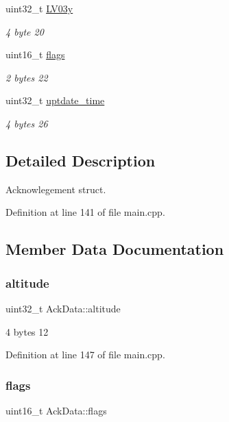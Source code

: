 \begin{DoxyCompactItemize}
uint32\+\_\+t \mbox{\hyperlink{structAckData_a1111544b84d5ecfa27f168d988e28b8f}{L\+V03y}}
\begin{DoxyCompactList}\small\item\em 4 byte 20 \end{DoxyCompactList}\item 
uint16\+\_\+t \mbox{\hyperlink{structAckData_a423568032481378a35f473683a81f949}{flags}}
\begin{DoxyCompactList}\small\item\em 2 bytes 22 \end{DoxyCompactList}\item 
uint32\+\_\+t \mbox{\hyperlink{structAckData_a577cc4e03ced6b2702d3a58260c05123}{uptdate\+\_\+time}}
\begin{DoxyCompactList}\small\item\em 4 bytes 26 \end{DoxyCompactList}\end{DoxyCompactItemize}


\subsection{Detailed Description}
Acknowlegement struct. 

Definition at line 141 of file main.\+cpp.



\subsection{Member Data Documentation}
\mbox{\label{structAckData_acecd408a738b38414650ba1fc89d8bf3}} 
\subsubsection{\texorpdfstring{altitude}{altitude}}
{\footnotesize\ttfamily uint32\+\_\+t Ack\+Data\+::altitude}



4 bytes 12 



Definition at line 147 of file main.\+cpp.

\mbox{\label{structAckData_a423568032481378a35f473683a81f949}} 
\subsubsection{\texorpdfstring{flags}{flags}}
{\footnotesize\ttfamily uint16\+\_\+t Ack\+Data\+::flags}



